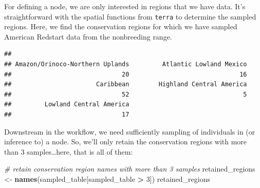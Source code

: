 \documentclass[
]{book}
\newenvironment{Shaded}{\begin{snugshade}}{\end{snugshade}}
\newcommand{\AttributeTok}[1]{\textcolor[rgb]{0.13,0.29,0.53}{#1}}
\newcommand{\CommentTok}[1]{\textcolor[rgb]{0.56,0.35,0.01}{\textit{#1}}}
\newcommand{\DecValTok}[1]{\textcolor[rgb]{0.00,0.00,0.81}{#1}}
\newcommand{\FunctionTok}[1]{\textcolor[rgb]{0.13,0.29,0.53}{\textbf{#1}}}
\newcommand{\NormalTok}[1]{#1}
\newcommand{\OtherTok}[1]{\textcolor[rgb]{0.56,0.35,0.01}{#1}}
\newcommand{\SpecialCharTok}[1]{\textcolor[rgb]{0.81,0.36,0.00}{\textbf{#1}}}
\newcommand{\StringTok}[1]{\textcolor[rgb]{0.31,0.60,0.02}{#1}}
\begin{document}
For defining a node, we are only interested in regions that we have data. It's straightforward with the spatial functions from \texttt{terra} to determine the sampled regions. Here, we find the conservation regions for which we have sampled American Redstart data from the nonbreeding range.

\begin{Shaded}
\end{Shaded}

\begin{verbatim}
## 
## Amazon/Orinoco-Northern Uplands         Atlantic Lowland Mexico 
##                              20                              16 
##                       Caribbean        Highland Central America 
##                              52                               5 
##         Lowland Central America 
##                              17
\end{verbatim}

Downstream in the workflow, we need sufficiently sampling of individuals in (or inference to) a node. So, we'll only retain the conservation regions with more than 3 samples\ldots here, that is all of them:

\begin{Shaded}
\begin{Highlighting}[]
\CommentTok{\# retain conservation region names with more than 3 samples}
\NormalTok{retained\_regions }\OtherTok{\textless{}{-}} \FunctionTok{names}\NormalTok{(sampled\_table[sampled\_table }\SpecialCharTok{\textgreater{}} \DecValTok{3}\NormalTok{])}
\NormalTok{retained\_regions}
\end{Highlighting}
\end{Shaded}
\end{document}
